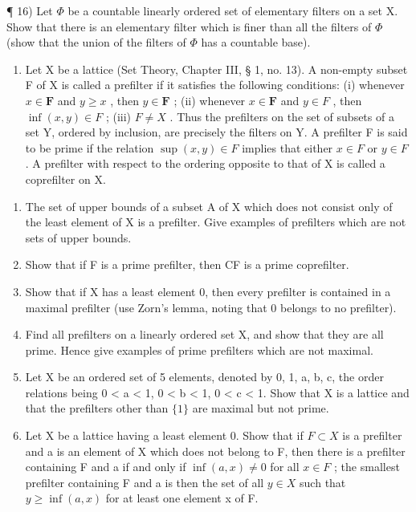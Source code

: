 ¶ 16) Let \(\Phi\) be a countable linearly ordered set of elementary filters on a set X. Show that there is an elementary filter which is finer than all the filters of \(\Phi\) (show that the union of the filters of \(\Phi\) has a countable base).

\begin{enumerate}
\def\labelenumi{\arabic{enumi})}
\setcounter{enumi}{16}
\tightlist
\item
  Let X be a lattice (Set Theory, Chapter III, § 1, no. 13). A non-empty subset F of X is called a prefilter if it satisfies the following conditions: (i) whenever \(x \in \mathbf{F}\) and \(y \geqslant x\) , then \(y \in \mathbf{F}\) ; (ii) whenever \(x \in \mathbf{F}\) and \(y \in F\) , then \(\inf (x, y) \in F\) ; (iii) \(F \neq X\) . Thus the prefilters on the set of subsets of a set Y, ordered by inclusion, are precisely the filters on Y. A prefilter F is said to be prime if the relation \(\sup(x, y) \in F\) implies that either \(x \in F\) or \(y \in F\) . A prefilter with respect to the ordering opposite to that of X is called a coprefilter on X.
\end{enumerate}

\begin{enumerate}
\def\labelenumi{\alph{enumi})}
\item
  The set of upper bounds of a subset A of X which does not consist only of the least element of X is a prefilter. Give examples of prefilters which are not sets of upper bounds.
\item
  Show that if F is a prime prefilter, then CF is a prime coprefilter.
\item
  Show that if X has a least element 0, then every prefilter is contained in a maximal prefilter (use Zorn's lemma, noting that 0 belongs to no prefilter).
\item
  Find all prefilters on a linearly ordered set X, and show that they are all prime. Hence give examples of prime prefilters which are not maximal.
\item
  Let X be an ordered set of 5 elements, denoted by 0, 1, a, b, c, the order relations being 0 \textless{} a \textless{} 1, 0 \textless{} b \textless{} 1, 0 \textless{} c \textless{} 1. Show that X is a lattice and that the prefilters other than \(\{1\}\) are maximal but not prime.
\item
  Let X be a lattice having a least element 0. Show that if \(F \subset X\) is a prefilter and a is an element of X which does not belong to F, then there is a prefilter containing F and a if and only if \(\inf (a, x) \neq 0\) for all \(x \in F\) ; the smallest prefilter containing F and a is then the set of all \(y \in X\) such that \(y \geqslant \inf (a, x)\) for at least one element x of F.
\end{enumerate}

